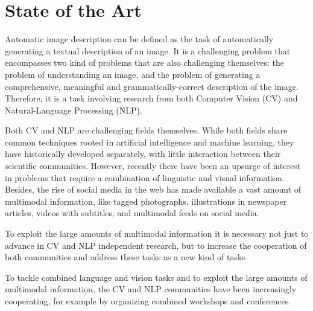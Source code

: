 \chapter{State of the Art}
\label{chapter:state_of_the_art}

Automatic image description can be defined as the task of automatically generating a textual description of an image. It is a challenging problem that encompasses two kind of problems that are also challenging themselves: the problem of understanding an image, and the problem of generating a comprehensive, meaningful and grammatically-correct description of the image. Therefore, it is a task involving research from both Computer Vision (CV) and Natural-Language Processing (NLP).

Both CV and NLP are challenging fields themselves. While both fields share common techniques rooted in artificial intelligence and machine learning, they have historically developed separately, with little interaction between their scientific communities. However, recently there have been an upsurge of interest in problems that require a combination of linguistic and visual information. Besides, the rise of social media in the web has made available a vast amount of multimodal information, like tagged photographs, illustrations in newspaper articles, videos with subtitles, and multimodal feeds on social media.

To exploit the large amounts of multimodal information it is necessary not just to advance in CV and NLP independent research, but to increase the cooperation of both communities and address these tasks as a new kind of tasks

To tackle combined language and vision tasks and to exploit the large amounts of multimodal information, the CV and NLP communities have been increasingly cooperating, for example by organizing combined workshops and conferences.
